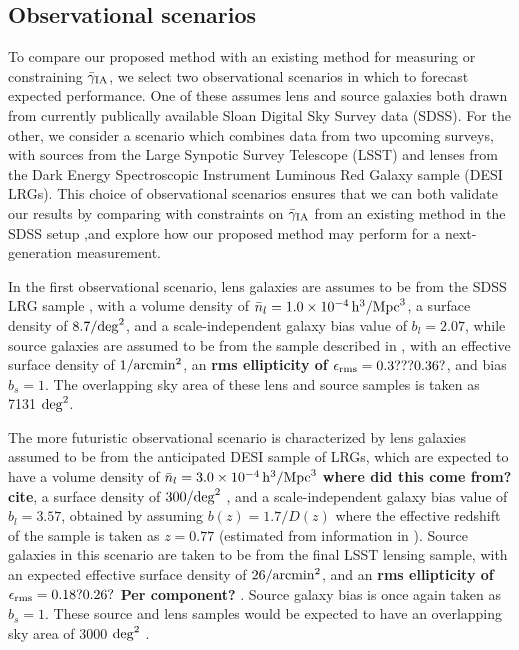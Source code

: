 \documentclass[a4paper,fleqn,usenatbib]{mnras}
\begin{document}
\subsection{Observational scenarios}
\label{subsec:obsscen}
\noindent
To compare our proposed method with an existing method for measuring or constraining $\bar{\gamma}_{\rm IA}$, we select two observational scenarios in which to forecast expected performance. One of these assumes lens and source galaxies both drawn from currently publically available Sloan Digital Sky Survey data (SDSS). For the other, we consider a scenario which combines data from two upcoming surveys, with sources from the Large Synpotic Survey Telescope (LSST) and lenses from the Dark Energy Spectroscopic Instrument Luminous Red Galaxy sample (DESI LRGs). This choice of observational scenarios ensures that we can both validate our results by comparing with constraints on $\bar{\gamma}_{\rm IA}$ from an existing method in the SDSS setup ,and explore how our proposed method may perform for a next-generation measurement. 

In the first observational scenario, lens galaxies are assumes to be from the SDSS LRG sample \cite{Kazin2010}, with a volume density of $\bar{n}_l = 1.0 \times 10^{-4} \, {\rm h}^3 / {\rm Mpc}^3$, a surface density of $8.7/{\rm deg}^2$, and a scale-independent galaxy bias value of $b_l=2.07$, while source galaxies are assumed to be from the sample described in \cite{Reyes2012}, with an effective surface density of $1/{\rm arcmin}^2$, an { \bf rms ellipticity of $\epsilon_{\rm rms} = 0.3??? 0.36?$}, and bias $b_s=1$. The overlapping sky area of these lens and source samples is taken as 7131 ${\rm deg}^2$. 

The more futuristic observational scenario is characterized by lens galaxies assumed to be from the anticipated DESI sample of LRGs, which are expected to have a volume density of $\bar{n}_l = 3.0 \times 10^{-4} \, {\rm h}^3 / {\rm Mpc}^3$ {\bf where did this come from? cite}, a surface density of $300/{\rm deg}^2$ \cite{DESIExperiment}, and a scale-independent galaxy bias value of $b_l=3.57$, obtained by assuming $b(z)= 1.7 / D(z)$ where the effective redshift of the sample is taken as $z=0.77$ (estimated from information in \cite{DESIExperiment}). Source galaxies in this scenario are taken to be from the final LSST lensing sample, with an expected effective surface density of $26/{\rm arcmin}^2$, and an { \bf rms ellipticity of $\epsilon_{\rm rms} = 0.18? 0.26?$ Per component?} \cite{Chang2013}. Source galaxy bias is once again taken as $b_s=1$. These source and lens samples would be expected to have an overlapping sky area of 3000 ${\rm deg}^2$ \cite{Schmidt2014}. 
\end{document}
